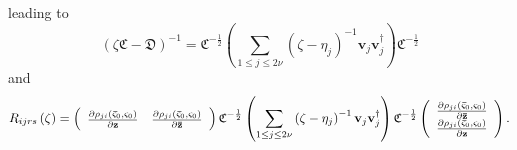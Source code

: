 \documentclass[aps,preprint]{revtex4}%
\begin{document}
leading to
\begin{equation}
\left(  \zeta\mathfrak{C}-\mathfrak{D}\right)  ^{-1}=\mathfrak{C}^{-\frac
{1}{2}}\left(  \sum_{1\leq j\leq2\nu}\left(  \zeta-\eta_{j}\right)
^{-1}\mathbf{v}_{j}\mathbf{v}_{j}^{\dagger}\right)  \mathfrak{C}^{-\frac{1}%
{2}}%
\end{equation}
and
\begin{equation}
R_{ijrs}\left(  \zeta\right)  =\left(
\begin{array}
[c]{cc}%
\frac{\partial\rho_{ji}\left(  \mathbf{\bar{\varsigma}}_{0},\mathbf{\varsigma
}_{0}\right)  }{\partial\mathbf{z}} & \frac{\partial\rho_{ji}\left(
\mathbf{\bar{\varsigma}}_{0},\mathbf{\varsigma}_{0}\right)  }{\partial
\mathbf{\bar{z}}}%
\end{array}
\right)  \mathfrak{C}^{-\frac{1}{2}}\left(  \sum_{1\leq j\leq2\nu}\left(
\zeta-\eta_{j}\right)  ^{-1}\mathbf{v}_{j}\mathbf{v}_{j}^{\dagger}\right)
\mathfrak{C}^{-\frac{1}{2}}\left(
\begin{array}
[c]{c}%
\frac{\partial\rho_{ji}\left(  \mathbf{\bar{\varsigma}}_{0},\mathbf{\varsigma
}_{0}\right)  }{\partial\mathbf{\bar{z}}}\\
\frac{\partial\rho_{ji}\left(  \mathbf{\bar{\varsigma}}_{0},\mathbf{\varsigma
}_{0}\right)  }{\partial\mathbf{z}}%
\end{array}
\right)  .
\end{equation}
\end{document}
